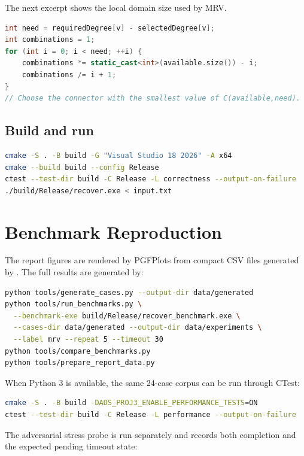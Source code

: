 \documentclass[11pt,a4paper,oneside]{article}
\begin{document}
The next excerpt shows the local domain size used by MRV.

\begin{lstlisting}[language=C++,caption={MRV domain size excerpt}]
int need = requiredDegree[v] - selectedDegree[v];
int combinations = 1;
for (int i = 0; i < need; ++i) {
    combinations *= static_cast<int>(available.size()) - i;
    combinations /= i + 1;
}
// Choose the connector with the smallest value of C(available,need).
\end{lstlisting}

\subsection{Build and run}

\begin{lstlisting}[language=bash,caption={Reproduction commands}]
cmake -S . -B build -G "Visual Studio 18 2026" -A x64
cmake --build build --config Release
ctest --test-dir build -C Release -L correctness --output-on-failure
./build/Release/recover.exe < input.txt
\end{lstlisting}

\section{Benchmark Reproduction}

The report figures are rendered by PGFPlots from compact CSV files generated by
. The full results are generated by:

\begin{lstlisting}[language=bash]
python tools/generate_cases.py --output-dir data/generated
python tools/run_benchmarks.py \
  --benchmark-exe build/Release/recover_benchmark.exe \
  --cases-dir data/generated --output-dir data/experiments \
  --label mrv --repeat 5 --timeout 30
python tools/compare_benchmarks.py
python tools/prepare_report_data.py
\end{lstlisting}

When Python 3 is available, the same 24-case corpus can be run through CTest:

\begin{lstlisting}[language=bash]
cmake -S . -B build -DADS_PROJ3_ENABLE_PERFORMANCE_TESTS=ON
ctest --test-dir build -C Release -L performance --output-on-failure
\end{lstlisting}

The adversarial stress probe is run separately and records both completion and
the expected pending timeout state:
\end{document}

